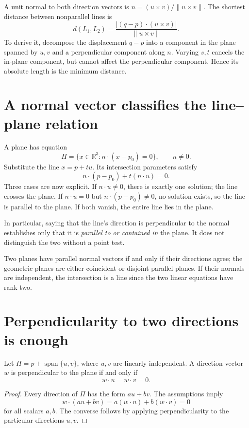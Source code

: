 A unit normal to both direction vectors is \(n=(u\times v)/\|u\times v\|\). The shortest distance between nonparallel lines is
\[
 d(L_1,L_2)=\frac{|(q-p)\cdot(u\times v)|}{\|u\times v\|}.
\]
To derive it, decompose the displacement \(q-p\) into a component in the plane spanned by \(u,v\) and a perpendicular component along \(n\). Varying \(s,t\) cancels the in-plane component, but cannot affect the perpendicular component. Hence its absolute length is the minimum distance.

\section{A normal vector classifies the line--plane relation}

A plane has equation
\[
 \Pi=\{x\in\mathbb R^3:n\cdot(x-p_0)=0\},\qquad n\ne0.
\]
Substitute the line \(x=p+tu\). Its intersection parameters satisfy
\[
 n\cdot(p-p_0)+t(n\cdot u)=0.
\]
Three cases are now explicit. If \(n\cdot u\ne0\), there is exactly one solution; the line crosses the plane. If \(n\cdot u=0\) but \(n\cdot(p-p_0)\ne0\), no solution exists, so the line is parallel to the plane. If both vanish, the entire line lies in the plane.

In particular, saying that the line's direction is perpendicular to the normal establishes only that it is \emph{parallel to or contained in} the plane. It does not distinguish the two without a point test.

Two planes have parallel normal vectors if and only if their directions agree; the geometric planes are either coincident or disjoint parallel planes. If their normals are independent, the intersection is a line since the two linear equations have rank two.

\section{Perpendicularity to two directions is enough}

\begin{theorem}
Let \(\Pi=p+\operatorname{span}\{u,v\}\), where \(u,v\) are linearly independent. A direction vector \(w\) is perpendicular to the plane if and only if
\[
 w\cdot u=w\cdot v=0.
\]
\end{theorem}
\begin{proof}
Every direction of \(\Pi\) has the form \(au+bv\). The assumptions imply
\[
 w\cdot(au+bv)=a(w\cdot u)+b(w\cdot v)=0
\]
for all scalars \(a,b\). The converse follows by applying perpendicularity to the particular directions \(u,v\).
\end{proof}

